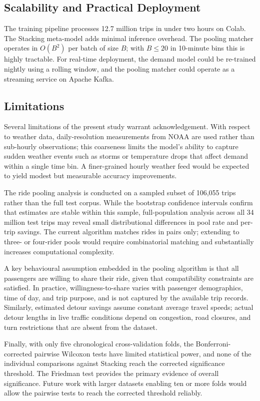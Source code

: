 \subsection{Scalability and Practical Deployment}

The training pipeline processes 12.7 million trips in under two hours on Colab. The Stacking meta-model adds minimal inference overhead. The pooling matcher operates in $O(B^2)$ per batch of size $B$; with $B \leq 20$ in 10-minute bins this is highly tractable. For real-time deployment, the demand model could be re-trained nightly using a rolling window, and the pooling matcher could operate as a streaming service on Apache Kafka.

\subsection{Limitations}

Several limitations of the present study warrant acknowledgement. With respect to weather data, daily-resolution measurements from NOAA are used rather than sub-hourly observations; this coarseness limits the model's ability to capture sudden weather events such as storms or temperature drops that affect demand within a single time bin. A finer-grained hourly weather feed would be expected to yield modest but measurable accuracy improvements.

The ride pooling analysis is conducted on a sampled subset of 106,055 trips rather than the full test corpus. While the bootstrap confidence intervals confirm that estimates are stable within this sample, full-population analysis across all 34 million test trips may reveal small distributional differences in pool rate and per-trip savings. The current algorithm matches rides in pairs only; extending to three- or four-rider pools would require combinatorial matching and substantially increases computational complexity.

A key behavioural assumption embedded in the pooling algorithm is that all passengers are willing to share their ride, given that compatibility constraints are satisfied. In practice, willingness-to-share varies with passenger demographics, time of day, and trip purpose, and is not captured by the available trip records. Similarly, estimated detour savings assume constant average travel speeds; actual detour lengths in live traffic conditions depend on congestion, road closures, and turn restrictions that are absent from the dataset.

Finally, with only five chronological cross-validation folds, the Bonferroni-corrected pairwise Wilcoxon tests have limited statistical power, and none of the individual comparisons against Stacking reach the corrected significance threshold. The Friedman test provides the primary evidence of overall significance. Future work with larger datasets enabling ten or more folds would allow the pairwise tests to reach the corrected threshold reliably.

